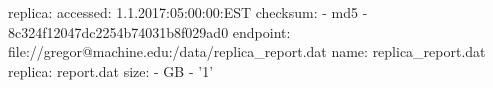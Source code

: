 replica:
  accessed: 1.1.2017:05:00:00:EST
  checksum:
  - md5
  - 8c324f12047dc2254b74031b8f029ad0
  endpoint: file://gregor@machine.edu:/data/replica_report.dat
  name: replica_report.dat
  replica: report.dat
  size:
  - GB
  - '1'
